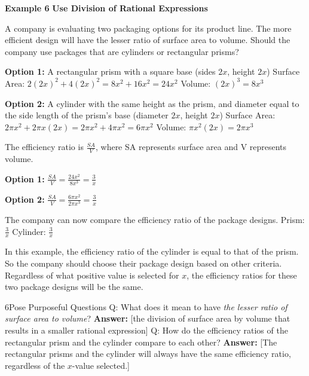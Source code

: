 \documentclass{article}
\newenvironment{example}[1]{\textbf{Example #1}}{}
\newenvironment{te-addendum}[2]{\textbf{TE (#1 - #2)}}{}
\newcommand{\answer}[1]{\textbf{Answer:} #1}
\begin{document}
\begin{example}{6}
\textbf{Use Division of Rational Expressions}

A company is evaluating two packaging options for its product line. The more efficient design will have the lesser ratio of surface area to volume. Should the company use packages that are cylinders or rectangular prisms?

\textbf{Option 1:} A rectangular prism with a square base (sides $2x$, height $2x$)
Surface Area: $2(2x)^2 + 4(2x)^2 = 8x^2 + 16x^2 = 24x^2$
Volume: $(2x)^3 = 8x^3$

\textbf{Option 2:} A cylinder with the same height as the prism, and diameter equal to the side length of the prism's base (diameter $2x$, height $2x$)
Surface Area: $2\pi x^2 + 2\pi x(2x) = 2\pi x^2 + 4\pi x^2 = 6\pi x^2$
Volume: $\pi x^2(2x) = 2\pi x^3$

The efficiency ratio is $\frac{SA}{V}$, where SA represents surface area and V represents volume.

\textbf{Option 1:}
$\frac{SA}{V} = \frac{24x^2}{8x^3} = \frac{3}{x}$

\textbf{Option 2:}
$\frac{SA}{V} = \frac{6\pi x^2}{2\pi x^3} = \frac{3}{x}$

The company can now compare the efficiency ratio of the package designs.
Prism: $\frac{3}{x}$ \qquad Cylinder: $\frac{3}{x}$

In this example, the efficiency ratio of the cylinder is equal to that of the prism. So the company should choose their package design based on other criteria. Regardless of what positive value is selected for $x$, the efficiency ratios for these two package designs will be the same.
\end{example}

\begin{te-addendum}{6}{Pose Purposeful Questions}
Q: What does it mean to have \textit{the lesser ratio of surface area to volume}?
\answer{[the division of surface area by volume that results in a smaller rational expression]}
Q: How do the efficiency ratios of the rectangular prism and the cylinder compare to each other?
\answer{[The rectangular prisms and the cylinder will always have the same efficiency ratio, regardless of the $x$-value selected.]}
\end{te-addendum}
\end{document}
